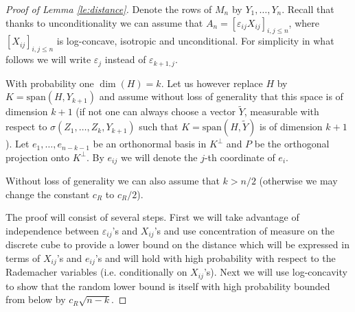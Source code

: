 \documentclass[12pt,reqno]{amsart}
\begin{document}
\begin{proof}[Proof of Lemma \ref{le:distance}]
  Denote the rows of $M_n$ by $Y_1,\ldots,Y_n$. Recall that thanks to
  unconditionality we can assume that $A_n = [\varepsilon_{ij}X_{ij}]_{i,j\le
    n}$, where $[X_{ij}]_{i,j\le n}$ is log-concave, isotropic and
  unconditional. For simplicity in what follows we will write $\varepsilon_j$
  instead of $\varepsilon_{k+1,j}$.

  With probability one $\dim(H) = k$. Let us however replace $H$ by $K
  ={\mathrm{span}}(H,Y_{k+1})$ and assume without loss of generality that this space is
  of dimension $k+1$ (if not one can always choose a vector $\tilde{Y}$,
  measurable with respect to $\sigma(Z_1,\ldots,Z_k,Y_{k+1})$ such that $K =
  {\mathrm{span}}(H,\tilde{Y})$ is of dimension $k+1$). Let $e_1,\ldots,e_{n-k-1}$ be an
  orthonormal basis in $K^\perp$ and $P$ be the orthogonal projection onto
  $K^\perp$. By $e_{ij}$ we will denote the $j$-th coordinate of $e_i$.
  \medskip

  Without loss of generality we can also assume that $k > n/2$ (otherwise we
  may change the constant $c_R$ to $c_R/2$).

  The proof will consist of several steps. First we will take advantage of
  independence between $\varepsilon_{ij}$'s and $X_{ij}$'s and use
  concentration of measure on the discrete cube to provide a lower bound on
  the distance which will be expressed in terms of $X_{ij}$'s and $e_{ij}$'s
  and will hold with high probability with respect to the Rademacher variables
  (i.e. conditionally on $X_{ij}$'s). Next we will use log-concavity to show
  that the random lower bound is itself with high probability bounded from
  below by $c_R\sqrt{n-k}$.

  \medskip


\end{proof}
\end{document}
